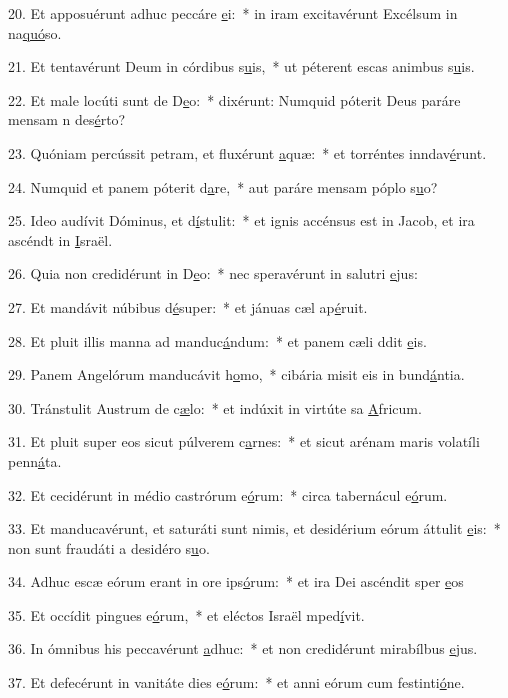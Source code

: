 20. Et apposuérunt adhuc peccáre \uline{e}i:~* in iram excitavérunt Excélsum in na\uline{quó}so.\par 
21. Et tentavérunt Deum in córdibus s\uline{u}is,~* ut péterent escas animbus s\uline{u}is.\par 
22. Et male locúti sunt de D\uline{e}o:~* dixérunt: Numquid póterit Deus paráre mensam n des\uline{é}rto?\par 
23. Quóniam percússit petram, et fluxérunt \uline{a}quæ:~* et torréntes inndav\uline{é}runt.\par 
24. Numquid et panem póterit d\uline{a}re,~* aut paráre mensam póplo s\uline{u}o?\par 
25. Ideo audívit Dóminus, et d\uline{í}stulit:~* et ignis accénsus est in Jacob, et ira ascéndt in \uline{I}sraël.\par 
26. Quia non credidérunt in D\uline{e}o:~* nec speravérunt in salutri \uline{e}jus:\par 
27. Et mandávit núbibus d\uline{é}super:~* et jánuas cæl ap\uline{é}ruit.\par 
28. Et pluit illis manna ad manduc\uline{á}ndum:~* et panem cæli ddit \uline{e}is.\par 
29. Panem Angelórum manducávit h\uline{o}mo,~* cibária misit eis in bund\uline{á}ntia.\par 
30. Tránstulit Austrum de c\uline{æ}lo:~* et indúxit in virtúte sa \uline{A}fricum.\par 
31. Et pluit super eos sicut púlverem c\uline{a}rnes:~* et sicut arénam maris volatíli penn\uline{á}ta.\par 
32. Et cecidérunt in médio castrórum e\uline{ó}rum:~* circa tabernácul e\uline{ó}rum.\par 
33. Et manducavérunt, et saturáti sunt nimis, et desidérium eórum áttulit \uline{e}is:~* non sunt fraudáti a desidéro s\uline{u}o.\par 
34. Adhuc escæ eórum erant in ore ips\uline{ó}rum:~* et ira Dei ascéndit sper \uline{e}os\par 
35. Et occídit pingues e\uline{ó}rum,~* et eléctos Israël mped\uline{í}vit.\par 
36. In ómnibus his peccavérunt \uline{a}dhuc:~* et non credidérunt mirabílbus \uline{e}jus.\par 
37. Et defecérunt in vanitáte dies e\uline{ó}rum:~* et anni eórum cum festinti\uline{ó}ne.\par 
